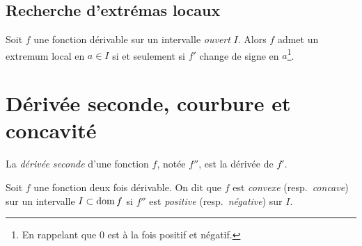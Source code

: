 \documentclass[main.tex]{subfiles}
\begin{document}
\subsection{Recherche d'extrémas locaux}

\begin{proposition}

    Soit $f$ une fonction dérivable sur un intervalle \emph{ouvert} $I$.
    Alors $f$ admet un extremum local en $a \in I$
    si et seulement si
    $f'$ change de signe en $a$\footnote{%
        En rappelant que $0$ est à la fois positif et négatif.
    }.
\end{proposition}

\section{Dérivée seconde, courbure et concavité}

La \emph{dérivée seconde} d'une fonction $f$,
notée $f''$,
est la dérivée de $f'$.

\begin{definition}
    [Convexité]

    Soit $f$ une fonction deux fois dérivable.
    On dit que $f$ est \emph{convexe} (resp.\ \emph{concave}) sur un intervalle $I \subset \operatorname{dom} f$
    si $f''$ est \emph{positive} (resp.\ \emph{négative}) sur $I$.
\end{definition}
\end{document}
